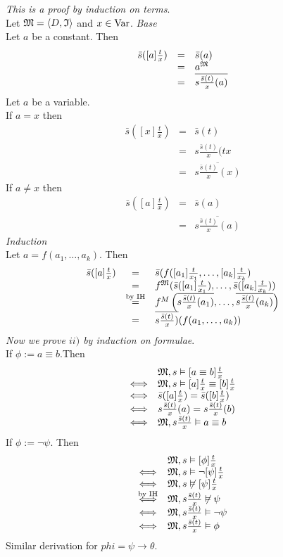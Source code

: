 \documentclass[11pt,a4paper]{article}
\begin{document}
\textit{This is a proof by induction on terms}.\\
Let $\mathfrak{M}=\langle D,\mathfrak{I}\rangle$ and $x\in\mathrm{Var}$.
\textit{Base}\\
Let $a$ be a constant. Then
\[\begin{array}{rcl}
\bar{s}([a]\frac{t}{x})&=&\bar{s}(a)\\
&=&a^{\mathfrak{M}}\\
&=&\overline{s\frac{\bar{s}(t)}{x}(a)}
\end{array}\]
Let $a$ be a variable.\\
If $a=x$ then
\[\begin{array}{rcl}
\bar{s}([x]\frac{t}{x})&=&\bar{s}(t)\\
&=&s\frac{\bar{s}(t)}{x}(tx\\
&=&\overline{s\frac{\bar{s}(t)}{x}(x)}
\end{array}\]
If $a\neq x$ then
\[\begin{array}{rcl}
\bar{s}([a]\frac{t}{x})&=&\bar{s}(a)\\
&=&\overline{s\frac{\bar{s}(t)}{x}(a)}
\end{array}\]
\textit{Induction}\\
Let $a=f(a_1,\dots,a_k)$. Then
\[\begin{array}{rcl}
\bar{s}([a]\frac{t}{x})&=&\bar{s}(f([a_1]\frac{t}{x_1},\dots,[a_k]\frac{t}{x_k})\\
&=&f^{\mathfrak{M}}(\bar{s}([a_1]\frac{t}{x_1}),\dots,\bar{s}([a_k]\frac{t}{x_k}))\\
&\overset{\text{by IH}}=&f^M\left(\overline{s\frac{\bar{s}(t)}{x}(a_1)},\dots,\overline{s\frac{\bar{s}(t)}{x}(a_k)}\right)\\
&=&\overline{s\frac{\bar{s}(t)}{x})}(f(a_1,\dots,a_k))
\end{array}\]
\textit{Now we prove $ii)$ by induction on formulae}.\\
If $\phi:=a\equiv b$.Then
\[\begin{array}{rl}
&\mathfrak{M},s\vDash[a\equiv b]\frac{t}x\\
\Longleftrightarrow&\mathfrak{M},s\vDash[a]\frac{t}x\equiv[b]\frac{t}x\\
\Longleftrightarrow&\bar{s}([a]\frac{t}{x})=\bar{s}([b]\frac{t}{x})\\
\Longleftrightarrow&s\frac{\bar{s}(t)}{x}(a)=s\frac{\bar{s}(t)}{x}(b)\\
\Longleftrightarrow&\mathfrak{M},s\frac{\bar{s}(t)}{x}\vDash a\equiv b
\end{array}\]
If $\phi:=\neg\psi$. Then
\[\begin{array}{cl}
&\mathfrak{M},s\vDash[\phi]\frac{t}x\\
\Longleftrightarrow&\mathfrak{M},s\vDash\neg[\psi]\frac{t}x\\
\Longleftrightarrow&\mathfrak{M},s\not\vDash[\psi]\frac{t}x\\
\overset{\text{by IH}}{\Longleftrightarrow}&\mathfrak{M},s\frac{\bar{s}(t)}{x}\not\vDash\psi\\
\Longleftrightarrow&\mathfrak{M},s\frac{\bar{s}(t)}{x}\vDash\neg\psi\\
\Longleftrightarrow&\mathfrak{M},s\frac{\bar{s}(t)}{x}\vDash\phi
\end{array}\]
Similar derivation for $phi=\psi\to\theta$.\\
\end{document}
